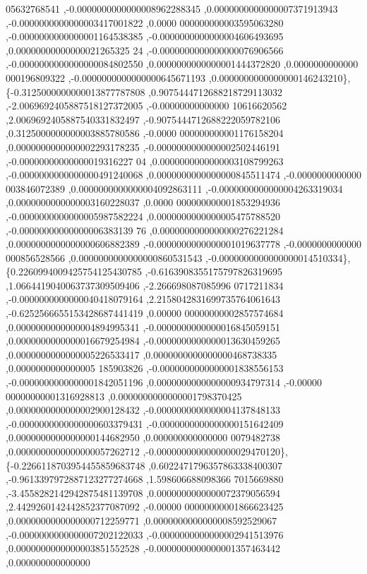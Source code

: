 \begin{DoxyCode}
      05632768541 ,-0.0000000000000008962288345 ,0.0000000000000007371913943 ,-0.0000000000000003417001822 ,0.0000
      000000000003595063280 ,-0.0000000000000001164538385 ,-0.0000000000000004606493695 ,0.00000000000000021265325
      24 ,-0.0000000000000000076906566 ,-0.0000000000000000084802550 ,0.0000000000000001444372820 ,0.0000000000000
      000196809322 ,-0.0000000000000000645671193 ,0.0000000000000000146243210\},
\{-0.3125000000000013877787808 ,0.9075444712688218729113032 ,-2.0069692405887518127372005 ,-0.00000000000000
      10616620562 ,2.0069692405887540331832497 ,-0.9075444712688222059782106 ,0.3125000000000003885780586 ,-0.0000
      000000000001176158204 ,0.0000000000000002293178235 ,-0.0000000000000002502446191 ,-0.00000000000000019316227
      04 ,0.0000000000000003108799263 ,-0.0000000000000000491240068 ,0.0000000000000000845511474 ,-0.0000000000000
      003846072389 ,0.0000000000000004092863111 ,-0.0000000000000004263319034 ,0.0000000000000003160228037 ,0.0000
      000000000001853294936 ,-0.0000000000000005987582224 ,0.0000000000000005475788520 ,-0.00000000000000006383139
      76 ,0.0000000000000000276221284 ,0.0000000000000000606882389 ,-0.0000000000000001019637778 ,-0.0000000000000
      000856528566 ,0.0000000000000000860531543 ,-0.0000000000000000014510334\},
\{0.2260994009425754125430785 ,-0.6163908355175797826319695 ,1.0664419040063737309509406 ,-2.266698087085996
      0717211834 ,-0.0000000000000040418079164 ,2.2158042831699735764061643 ,-0.6252566655153428687441419 ,0.00000
      00000000002857574684 ,0.0000000000000004894995341 ,-0.0000000000000016845059151 ,0.0000000000000016679254984
       ,-0.0000000000000013630459265 ,0.0000000000000005226533417 ,0.0000000000000000468738335 ,0.0000000000000005
      185903826 ,-0.0000000000000001838556153 ,-0.0000000000000001842051196 ,0.0000000000000000934797314 ,-0.00000
      00000000001316928813 ,0.0000000000000001798370425 ,0.0000000000000002900128432 ,-0.0000000000000004137848133
       ,-0.0000000000000000603379431 ,-0.0000000000000000151642409 ,0.0000000000000000144682950 ,0.000000000000000
      0079482738 ,0.0000000000000000057262712 ,-0.0000000000000000029470120\},
\{-0.2266118703954455859683748 ,0.6022471796357863338400307 ,-0.9613397972887123277274668 ,1.598606688098366
      7015669880 ,-3.4558282142942875481139708 ,0.0000000000000072379056594 ,2.4429260142442852377087092 ,-0.00000
      00000000001866623425 ,0.0000000000000000712259771 ,0.0000000000000008592529067 ,-0.0000000000000007202122033
       ,-0.0000000000000002941513976 ,0.0000000000000003851552528 ,-0.0000000000000001357463442 ,0.000000000000000

\end{DoxyCode}
